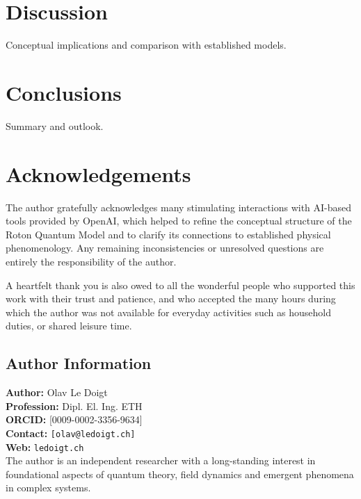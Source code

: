 \documentclass[11pt,a4paper]{article}
\begin{document}



\section{Discussion}

Conceptual implications and comparison with established models.


\section{Conclusions}

Summary and outlook.


\section*{Acknowledgements}

The author gratefully acknowledges many stimulating interactions with AI-based tools provided by OpenAI, which helped to refine the conceptual structure of the Roton Quantum Model and to clarify its connections to established physical phenomenology. Any remaining inconsistencies or unresolved questions are entirely the responsibility of the author. 

A heartfelt thank you is also owed to all the wonderful people who supported this work with their trust and patience, and who accepted the many hours during which the author was not available for everyday activities such as household duties, or shared leisure time.

\subsection*{Author Information}
\textbf{Author:} Olav Le Doigt \\
\textbf{Profession:} Dipl. El. Ing. ETH\\
\textbf{ORCID:} [0009-0002-3356-9634] \\
\textbf{Contact:} \texttt{[olav@ledoigt.ch]} \\
\textbf{Web:} \texttt{ledoigt.ch} \\[0.5em]
The author is an independent researcher with a long-standing interest in foundational aspects 
of quantum theory, field dynamics and emergent phenomena in complex systems.
\end{document}
